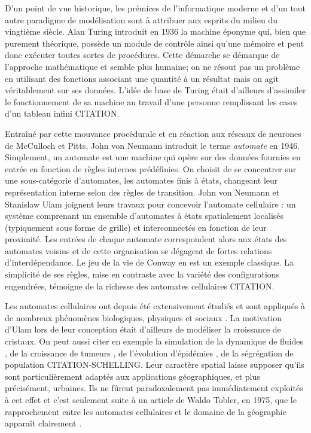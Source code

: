 \documentclass[10pt]{article}
\begin{document}
D'un point de vue historique, les prémices de l'informatique moderne
et d'un tout autre paradigme de modélisation sont à attribuer aux
esprits du milieu du vingtième siècle. Alan Turing introduit en 1936
la machine éponyme qui, bien que purement théorique, possède un module
de contrôle ainsi qu'une mémoire et peut donc exécuter toutes sortes
de procédures. Cette démarche se démarque de l'approche mathématique
et semble plus humaine; on ne résout pas un problème en utilisant des
fonctions associant une quantité à un résultat mais on agit
véritablement sur ses données. L'idée de base de Turing était
d'ailleurs d'assimiler le fonctionnement de sa machine au travail
d'une personne remplissant les cases d'un tableau infini CITATION.

Entraîné par cette mouvance procédurale et en réaction aux réseaux de
neurones de McCulloch et Pitts, John von Neumann introduit le terme
\textit{automate} en 1946. Simplement, un automate est une machine qui
opère sur des données fournies en entrée en fonction de règles
internes prédéfinies. On choisit de se concentrer sur une
sous-catégorie d'automates, les automates finis à états, changeant
leur représentation interne selon des règles de transition. John von
Neumann et Stanislaw Ulam joignent leurs travaux pour concevoir
l'automate cellulaire : un système comprenant un ensemble d'automates
à états spatialement localisés (typiquement sous forme de grille) et
interconnectés en fonction de leur proximité. Les entrées de chaque
automate correspondent alors aux états des automates voisins et de
cette organisation se dégagent de fortes relations
d'interdépendance. Le jeu de la vie de Conway en est un exemple
classique. La simplicité de ses règles, mise en contraste avec la
variété des configurations engendrées, témoigne de la richesse des
automates cellulaires CITATION.

Les automates cellulaires ont depuis été extensivement étudiés et sont
appliqués à de nombreux phénomènes biologiques, physiques et sociaux
\cite{Ganguly}. La motivation d'Ulam lors de leur conception était
d'ailleurs de modéliser la croissance de cristaux. On peut aussi citer
en exemple la simulation de la dynamique de fluides \cite{Frisch1986},
de la croissance de tumeurs \cite{Kansal2000}, de l'évolution
d'épidémies \cite{Fu2003}, de la ségrégation de population
CITATION-SCHELLING. Leur caractère spatial laisse supposer qu'ils sont
particulièrement adaptés aux applications géographiques, et plus
précisément, urbaines. Ils ne fûrent paradoxalement pas immédiatement
exploités à cet effet et c'est seulement suite à un article de Waldo
Tobler, en 1975, que le rapprochement entre les automates cellulaires
et le domaine de la géographie apparaît clairement \cite{Tobler1975}.
\end{document}
